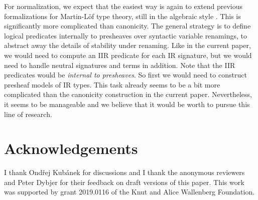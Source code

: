 \documentclass[acmsmall,screen,review]{acmart}
\begin{document}
For normalization, we expect that the easiest way is again to extend previous formalizations for
Martin-Löf type theory, still in the algebraic style
\cite{DBLP:journals/lmcs/AltenkirchK17,coquand2018canonicity,sterlingthesis,DBLP:conf/fscd/BocquetKS23}. This
is significantly more complicated than canonicity. The general strategy is to define logical
predicates internally to presheaves over syntactic variable renamings, to abstract away the details
of stability under renaming. Like in the current paper, we would need to compute an IIR predicate
for each IR signature, but we would need to handle neutral signatures and terms in addition. Note
that the IIR predicates would be \emph{internal to presheaves}. So first we would need to
construct presheaf models of IR types. This task already seems to be a bit more complicated than the
canonicity construction in the current paper. Nevertheless, it seems to be manageable and we believe
that it would be worth to pursue this line of research.

\section*{Acknowledgements}
I thank Ondřej Kubánek for discussions and I thank the anonymous reviewers and Peter Dybjer for
their feedback on draft versions of this paper. This work was supported by grant 2019.0116 of the
Knut and Alice Wallenberg Foundation.



\end{document}
